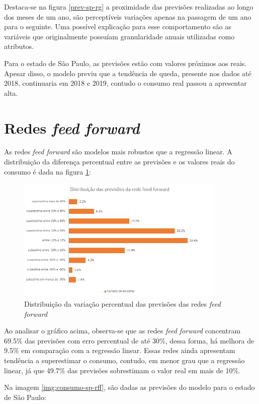 Destaca-se na figura \ref{prev-sp-rg} a proximidade das previsões realizadas 
ao longo dos meses de um ano, são perceptíveis variações apenas na passagem de um 
ano para o seguinte. Uma possível explicação para esse comportamento são as 
variáveis que originalmente possuíam granularidade anuais utilizadas como atributos.

Para o estado de São Paulo, as previsões estão com valores próximos aos
reais. Apesar disso, o modelo previu que a tendência de queda, presente
nos dados até 2018, continuaria em 2018 e 2019, contudo o consumo real passou 
a apresentar alta.

\section{Redes \textit{feed forward}}

As redes \textit{feed forward} são modelos mais robustos que a regressão linear.
A distribuição da diferença percentual entre as previsões e os valores reais 
do consumo é dada na figura \ref{img:erro-perc-rff}:

\begin{figure}[H]
    \centering
    \includegraphics[width=10cm]{../figuras/graficos/mlp/erro-perc-mlp.png}
    \caption{Distribuição da variação percentual das previsões das redes \textit{feed forward}}
    \label{img:erro-perc-rff}
\end{figure}

Ao analisar o gráfico acima, observa-se que as redes \textit{feed forward}
concentram 69.5\% das previsões com erro percentual de até 30\%, dessa forma, 
há melhora de 9.5\% em comparação com a regressão linear. Essas redes ainda 
apresentam tendência a superestimar o consumo, contudo, em menor grau que 
a regressão linear, já que 49.7\% das previsões sobrestimam  o valor real 
em mais de 10\%.

Na imagem \ref{img:consumo-sp-rff}, são dadas as previsões do modelo para o estado 
de São Paulo:

